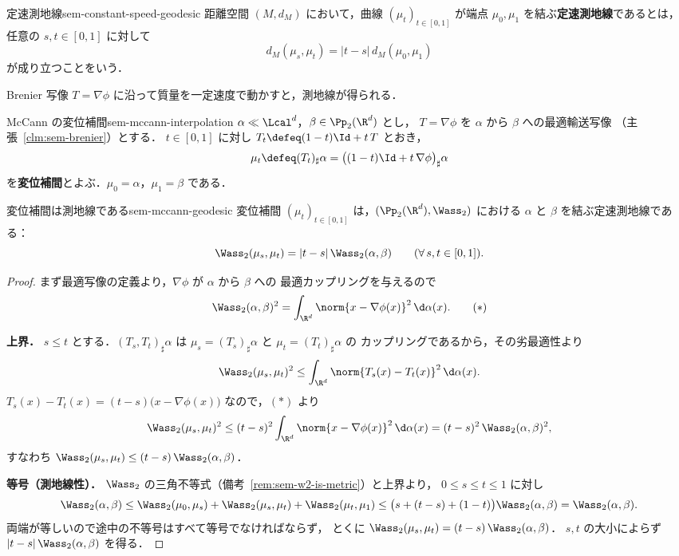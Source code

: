 \begin{definition}{定速測地線}{sem-constant-speed-geodesic}
  距離空間 $(M, d_M)$ において，曲線
  $(\mu_t)_{t \in [0,1]}$ が端点 $\mu_0, \mu_1$ を結ぶ\textbf{定速測地線}であるとは，
  任意の $s, t \in [0,1]$ に対して
  \[
    d_M(\mu_s, \mu_t) = |t - s|\, d_M(\mu_0, \mu_1)
  \]
  が成り立つことをいう．
\end{definition}

Brenier 写像 $T = \nabla\phi$ に沿って質量を一定速度で動かすと，測地線が得られる．

\begin{definition}{McCann の変位補間}{sem-mccann-interpolation}
  $\alpha \ll \Lcal^d$，$\beta \in \Pp_2(\R^d)$ とし，
  $T = \nabla\phi$ を $\alpha$ から $\beta$ への最適輸送写像
  （主張~\ref{clm:sem-brenier}）とする．
  $t \in [0,1]$ に対し $T_t \defeq (1-t)\Id + t\,T$ とおき，
  \[
    \mu_t \defeq (T_t)_\sharp \alpha
    = \bigl((1-t)\Id + t\,\nabla\phi\bigr)_\sharp \alpha
  \]
  を\textbf{変位補間}とよぶ．$\mu_0 = \alpha$，$\mu_1 = \beta$ である．
\end{definition}

\begin{theorem}{変位補間は測地線である}{sem-mccann-geodesic}
  変位補間 $(\mu_t)_{t \in [0,1]}$ は，$(\Pp_2(\R^d), \Wass_2)$ における
  $\alpha$ と $\beta$ を結ぶ定速測地線である：
  \[
    \Wass_2(\mu_s, \mu_t) = |t - s|\, \Wass_2(\alpha, \beta)
    \qquad (\forall\, s, t \in [0,1]).
  \]
\end{theorem}

\begin{proof}
  まず最適写像の定義より，$\nabla\phi$ が $\alpha$ から $\beta$ への
  最適カップリングを与えるので
  \[
    \Wass_2(\alpha, \beta)^2
    = \int_{\R^d} \norm{x - \nabla\phi(x)}^2 \,\d\alpha(x).
    \tag{$\ast$}
  \]

  \textbf{上界．}
  $s \leq t$ とする．$(T_s, T_t)_\sharp \alpha$ は
  $\mu_s = (T_s)_\sharp\alpha$ と $\mu_t = (T_t)_\sharp\alpha$ の
  カップリングであるから，その劣最適性より
  \[
    \Wass_2(\mu_s, \mu_t)^2
    \leq \int_{\R^d} \norm{T_s(x) - T_t(x)}^2 \,\d\alpha(x).
  \]
  $T_s(x) - T_t(x) = (t - s)\bigl(x - \nabla\phi(x)\bigr)$ なので，$(\ast)$ より
  \[
    \Wass_2(\mu_s, \mu_t)^2
    \leq (t - s)^2 \int_{\R^d} \norm{x - \nabla\phi(x)}^2 \,\d\alpha(x)
    = (t - s)^2\, \Wass_2(\alpha, \beta)^2,
  \]
  すなわち $\Wass_2(\mu_s, \mu_t) \leq (t - s)\,\Wass_2(\alpha, \beta)$．

  \textbf{等号（測地線性）．}
  $\Wass_2$ の三角不等式（備考~\ref{rem:sem-w2-is-metric}）と上界より，
  $0 \leq s \leq t \leq 1$ に対し
  \[
    \Wass_2(\alpha, \beta)
    \leq \Wass_2(\mu_0, \mu_s) + \Wass_2(\mu_s, \mu_t) + \Wass_2(\mu_t, \mu_1)
    \leq \bigl(s + (t - s) + (1 - t)\bigr)\Wass_2(\alpha, \beta)
    = \Wass_2(\alpha, \beta).
  \]
  両端が等しいので途中の不等号はすべて等号でなければならず，
  とくに $\Wass_2(\mu_s, \mu_t) = (t - s)\,\Wass_2(\alpha, \beta)$．
  $s, t$ の大小によらず $|t-s|\,\Wass_2(\alpha,\beta)$ を得る．
\end{proof}

